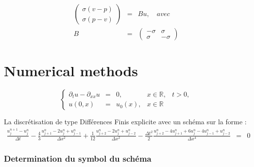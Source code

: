 \documentclass[a4paper,11pt]{article}
\begin{document}
\begin{equation*}
\begin{array}{rcl}
    \begin{pmatrix}
        \sigma(v-p) \\
        \sigma(p-v)
    \end{pmatrix} &=&
    Bu, \quad avec \\
    B &=&
    \begin{pmatrix}
        -\sigma & \sigma \\
        \sigma & -\sigma
    \end{pmatrix}
\end{array}
\end{equation*}

\section{}

\part{Numerical methods}

\begin{equation}
    \left\{
    \begin{array}{rclll}
        \partial_{t}u - \partial_{xx}u &=& 0, &x \in \mathbb{R}, & t>0, \\
        u(0, x) &=& u_{0}(x), &x \in \mathbb{R} &
    \end{array}
    \right.
\end{equation}

La discrétisation de type Différences Finis explicite avec un schéma sur la forme :
\begin{equation}
    \begin{array}{rcl}
        \frac{u^{n+1}_{j} - u^{n}_{j}}{\Delta t}
        -\frac{4}{3} \frac{u^{n}_{j+1} - 2u^{n}_{j} + u^{n}_{j-1}}{\Delta x^{2}}
        +\frac{1}{12} \frac{u^{n}_{j+2} - 2u^{n}_{j} + u^{n}_{j-2}}{\Delta x^{2}}
        -\frac{\Delta t^{2}}{2} \frac{u^{n}_{j+2} - 4u^{n}_{j+1} + 6u^{n}_{j}  - 4u^{n}_{j-1} + u^{n}_{j-2}}{\Delta x^{4}}  &=& 0 \label{scheme}
    \end{array}
\end{equation}


\section{Determination du symbol du schéma}
\end{document}
